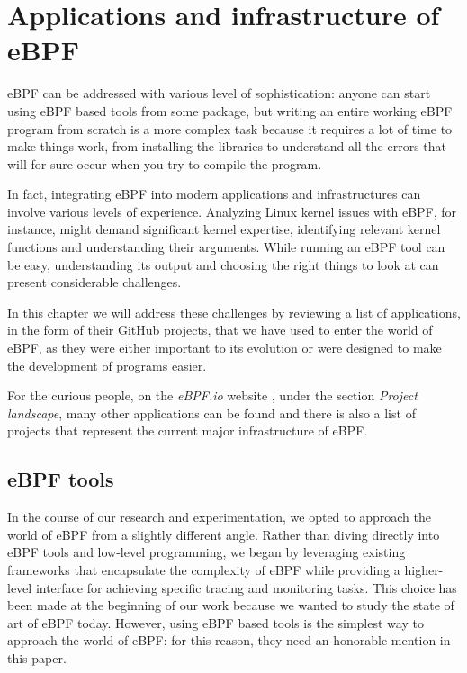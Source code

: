 \chapter{Applications and infrastructure of eBPF}

eBPF can be addressed with various level of sophistication: anyone can start using eBPF based tools from some package, but writing an entire working eBPF program from scratch is a more complex task because it requires a lot of time to make things work, from installing the libraries to understand all the errors that will for sure occur when you try to compile the program.

In fact, integrating eBPF into modern applications and infrastructures can involve various levels of experience. 
Analyzing Linux kernel issues with eBPF, for instance, might demand significant kernel expertise, identifying relevant kernel functions and understanding their arguments.
While running an eBPF tool can be easy, understanding its output and choosing the right things to look at can present considerable challenges.

In this chapter we will address these challenges by reviewing a list of applications, in the form of their GitHub projects, that we have used to enter the world of eBPF, as they were either important to its evolution or were designed to make the development of programs easier.

For the curious people, on the \textit{eBPF.io} website \cite{eBPFioWebsite}, under the section \textit{Project landscape}, many other applications can be found and there is also a list of projects that represent the current major infrastructure of eBPF.

%

\section{eBPF tools}

In the course of our research and experimentation, we opted to approach the world of eBPF from a slightly different angle. 
Rather than diving directly into eBPF tools and low-level programming, we began by leveraging existing frameworks that encapsulate the complexity of eBPF while providing a higher-level interface for achieving specific tracing and monitoring tasks.
This choice has been made at the beginning of our work because we wanted to study the state of art of eBPF today.
However, using eBPF based tools is the simplest way to approach the world of eBPF: for this reason, they need an honorable mention in this paper.

